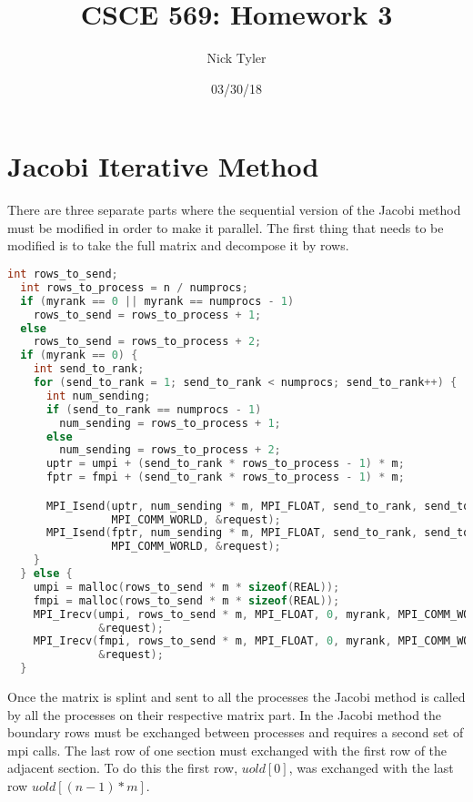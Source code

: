 \documentclass[a4paper]{article}
\title{CSCE 569: Homework 3}
\author{Nick Tyler}
\date{03/30/18}
\begin{document}
\maketitle

\section*{Jacobi Iterative Method}
There are three separate parts where the sequential version of the Jacobi method must be modified in order to make it parallel. The first thing that needs to be modified is to take the full matrix and decompose it by rows.

\begin{lstlisting}[language=C++]
  int rows_to_send;
  int rows_to_process = n / numprocs;
  if (myrank == 0 || myrank == numprocs - 1)
    rows_to_send = rows_to_process + 1;
  else
    rows_to_send = rows_to_process + 2;
  if (myrank == 0) {
    int send_to_rank;
    for (send_to_rank = 1; send_to_rank < numprocs; send_to_rank++) {
      int num_sending;
      if (send_to_rank == numprocs - 1)
        num_sending = rows_to_process + 1;
      else
        num_sending = rows_to_process + 2;
      uptr = umpi + (send_to_rank * rows_to_process - 1) * m;
      fptr = fmpi + (send_to_rank * rows_to_process - 1) * m;

      MPI_Isend(uptr, num_sending * m, MPI_FLOAT, send_to_rank, send_to_rank,
                MPI_COMM_WORLD, &request);
      MPI_Isend(fptr, num_sending * m, MPI_FLOAT, send_to_rank, send_to_rank,
                MPI_COMM_WORLD, &request);
    }
  } else {
    umpi = malloc(rows_to_send * m * sizeof(REAL));
    fmpi = malloc(rows_to_send * m * sizeof(REAL));
    MPI_Irecv(umpi, rows_to_send * m, MPI_FLOAT, 0, myrank, MPI_COMM_WORLD,
              &request);
    MPI_Irecv(fmpi, rows_to_send * m, MPI_FLOAT, 0, myrank, MPI_COMM_WORLD,
              &request);
  }
\end{lstlisting}

Once the matrix is splint and sent to all the processes the Jacobi method is called by all the processes on their respective matrix part. In the Jacobi method the boundary rows must be exchanged between processes and requires a second set of mpi calls. The last row of one section must exchanged with the first row of the adjacent section. To do this the first row, $uold[0]$, was exchanged with the last row $uold[(n-1)*m]$.
\end{document}
